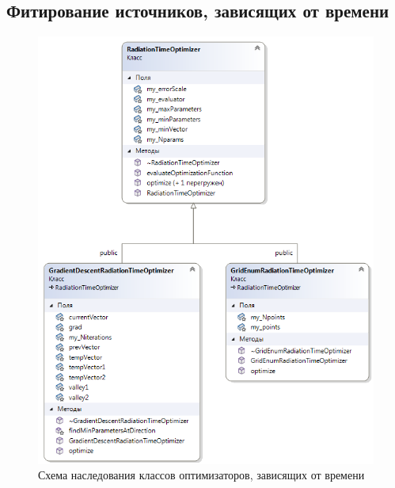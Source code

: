 \subsection{Фитирование источников, зависящих от времени}
\begin{figure}
	\centering
	\includegraphics[width=10.5 cm]{./fig/radiationOptimizerTime.png} 
	\caption{Схема наследования классов оптимизаторов, зависящих от времени}
	\label{radiationOptimizer}
\end{figure}